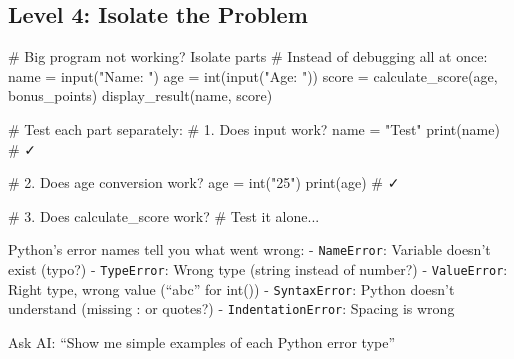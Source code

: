\documentclass[
  letterpaper,
  DIV=11,
  numbers=noendperiod,
  oneside]{scrreprt}
\newenvironment{Shaded}{}{}
\newcommand{\BuiltInTok}[1]{\textcolor[rgb]{0.84,0.23,0.29}{#1}}
\newcommand{\CommentTok}[1]{\textcolor[rgb]{0.42,0.45,0.49}{#1}}
\newcommand{\NormalTok}[1]{\textcolor[rgb]{0.14,0.16,0.18}{#1}}
\newcommand{\OperatorTok}[1]{\textcolor[rgb]{0.14,0.16,0.18}{#1}}
\newcommand{\StringTok}[1]{\textcolor[rgb]{0.01,0.18,0.38}{#1}}
\begin{document}
\subsection{Level 4: Isolate the
Problem}\label{level-4-isolate-the-problem}

\begin{Shaded}
\begin{Highlighting}[]
\CommentTok{\# Big program not working? Isolate parts}
\CommentTok{\# Instead of debugging all at once:}
\NormalTok{name }\OperatorTok{=} \BuiltInTok{input}\NormalTok{(}\StringTok{"Name: "}\NormalTok{)}
\NormalTok{age }\OperatorTok{=} \BuiltInTok{int}\NormalTok{(}\BuiltInTok{input}\NormalTok{(}\StringTok{"Age: "}\NormalTok{))}
\NormalTok{score }\OperatorTok{=}\NormalTok{ calculate\_score(age, bonus\_points)}
\NormalTok{display\_result(name, score)}

\CommentTok{\# Test each part separately:}
\CommentTok{\# 1. Does input work?}
\NormalTok{name }\OperatorTok{=} \StringTok{"Test"}
\BuiltInTok{print}\NormalTok{(name)  }\CommentTok{\# ✓}

\CommentTok{\# 2. Does age conversion work?}
\NormalTok{age }\OperatorTok{=} \BuiltInTok{int}\NormalTok{(}\StringTok{"25"}\NormalTok{)}
\BuiltInTok{print}\NormalTok{(age)  }\CommentTok{\# ✓}

\CommentTok{\# 3. Does calculate\_score work?}
\CommentTok{\# Test it alone...}
\end{Highlighting}
\end{Shaded}

\begin{tcolorbox}[enhanced jigsaw, opacityback=0, colback=white, colframe=quarto-callout-note-color-frame, breakable, titlerule=0mm, coltitle=black, rightrule=.15mm, colbacktitle=quarto-callout-note-color!10!white, left=2mm, bottomtitle=1mm, bottomrule=.15mm, title=\textcolor{quarto-callout-note-color}{\faInfo}\hspace{0.5em}{Expression Explorer: Common Error Types}, opacitybacktitle=0.6, toptitle=1mm, leftrule=.75mm, arc=.35mm, toprule=.15mm]

Python's error names tell you what went wrong: - \texttt{NameError}:
Variable doesn't exist (typo?) - \texttt{TypeError}: Wrong type (string
instead of number?) - \texttt{ValueError}: Right type, wrong value
(``abc'' for int()) - \texttt{SyntaxError}: Python doesn't understand
(missing : or quotes?) - \texttt{IndentationError}: Spacing is wrong

Ask AI: ``Show me simple examples of each Python error type''

\end{tcolorbox}
\end{document}
